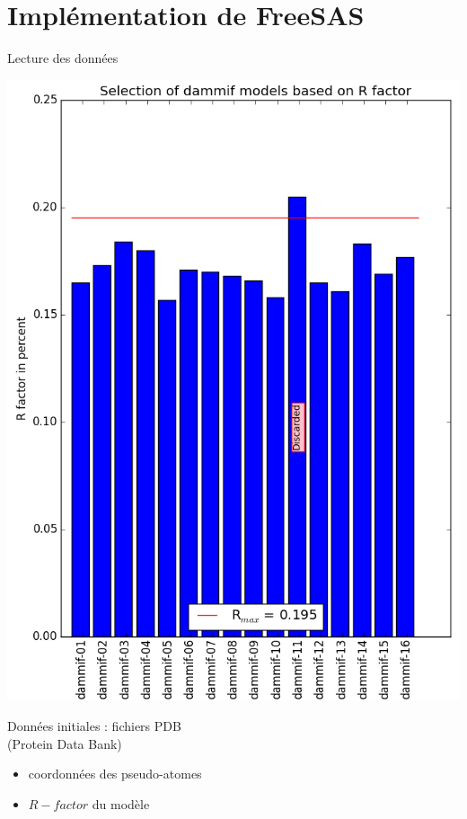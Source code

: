 \documentclass{beamer}
\begin{document}
\section{Impl\'ementation de FreeSAS}

\begin{frame}{Lecture des donn\'ees}
\begin{minipage}{0.45\linewidth}
    \begin{center}
    \includegraphics[scale=0.32]{Rfactor.png}
    \end{center}
\end{minipage} \hfill
\begin{minipage}{0.50\linewidth}
Donn\'ees initiales : fichiers PDB\\
(Protein Data Bank)
\begin{itemize}
  \item coordonn\'ees des pseudo-atomes
  \item $R-factor$ du mod\`ele
\end{itemize}


\end{minipage}
\end{frame}
\end{document}
